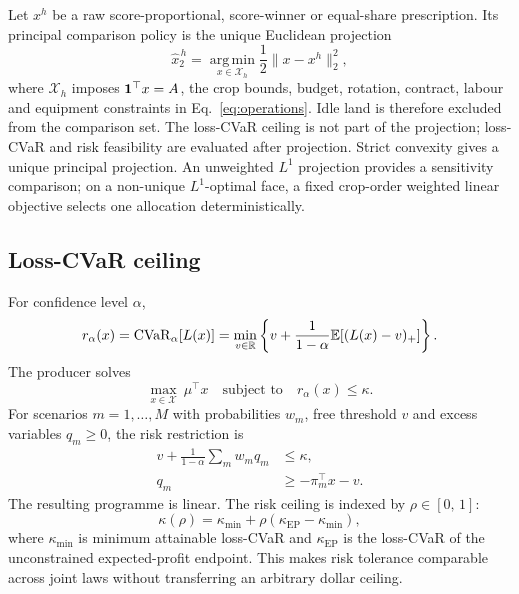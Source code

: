 Let \(x^h\) be a raw score-proportional, score-winner or equal-share
prescription. Its principal comparison policy is the unique Euclidean
projection
\begin{equation}
\widehat x^{\,h}_2
=\operatorname*{arg\,min}_{x\in\mathcal X_h}
\frac12\lVert x-x^h\rVert_2^2,
\label{eq:projection}
\end{equation}
where \(\mathcal X_h\) imposes \(\mathbf 1^\top x=A\), the crop bounds, budget,
rotation, contract, labour and equipment constraints in
Eq.~\ref{eq:operations}. Idle land is therefore excluded from the comparison
set. The loss-CVaR ceiling is not part of the projection; loss-CVaR and risk
feasibility are evaluated after projection. Strict convexity gives a unique
principal projection. An unweighted \(L^1\) projection provides a sensitivity
comparison; on a non-unique \(L^1\)-optimal face, a fixed crop-order weighted
linear objective selects one allocation deterministically.

\subsection{Loss-CVaR ceiling}

For confidence level \(\alpha\),
\begin{equation}
r_\alpha(x)=\operatorname{CVaR}_\alpha[L(x)]
=\min_{v\in\mathbb R}\left\{v+\frac{1}{1-\alpha}
\mathbb E[(L(x)-v)_+]\right\}.
\end{equation}
The producer solves
\begin{equation}
\max_{x\in\mathcal X}\ \mu^\top x
\quad\text{subject to}\quad r_\alpha(x)\le\kappa.
\label{eq:canonical}
\end{equation}
For scenarios \(m=1,\ldots,M\) with probabilities \(w_m\), free threshold
\(v\) and excess variables \(q_m\ge0\), the risk restriction is
\begin{align}
v+\frac{1}{1-\alpha}\sum_m w_mq_m&\le\kappa,\\
q_m&\ge-\pi_m^\top x-v.
\end{align}
The resulting programme is linear. The risk ceiling is indexed by
\(\rho\in[0,\,1]\):
\begin{equation}
\kappa(\rho)=\kappa_{\min}+\rho
\left(\kappa_{\mathrm{EP}}-\kappa_{\min}\right),
\label{eq:riskpath}
\end{equation}
where \(\kappa_{\min}\) is minimum attainable loss-CVaR and
\(\kappa_{\mathrm{EP}}\) is the loss-CVaR of the unconstrained
expected-profit endpoint. This makes risk tolerance comparable across joint
laws without transferring an arbitrary dollar ceiling.

